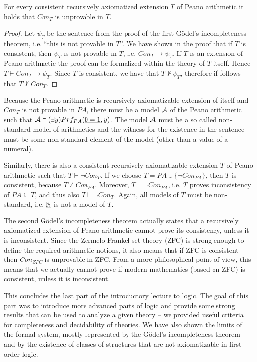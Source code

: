 \begin{theorem}
For every consistent recursively axiomatized extension $T$ of Peano arithmetic it holds that $Con_T$ is unprovable in $T$.
\end{theorem}
\begin{proof}
Let $\psi_T$ be the sentence from the proof of the first Gödel's incompleteness theorem, i.e. ``this is not provable in $T$''. We have shown in the proof that if $T$ is consistent, then $\psi_T$ is not provable in $T$, i.e. $Con_T \to \psi_T$. If $T$ is an extension of Peano arithmetic the proof can be formalized within the theory of $T$ itself. Hence $T\vdash Con_T \to \psi_T$. Since $T$ is consistent, we have that $T\nvdash \psi_T$, therefore if follows that $T \nvdash Con_T$. 
\end{proof}

Because the Peano arithmetic is recursively axiomatizable extension of itself and $Con_T$ is not provable in $PA$, there must be a model $\mathcal{A}$ of the Peano arithmetic such that $\mathcal{A} \vDash (\exists y)Prf_{PA}(\underline{0 = 1}, y)$. The model $\mathcal{A}$ must be a so called non-standard model of arithmetics and the witness for the existence in the sentence must be some non-standard element of the model (other than a value of a numeral).

Similarly, there is also a consistent recursively axiomatizable extension $T$ of Peano arithmetic such that $T \vdash \neg Con_T$. If we choose $T = PA \cup \{\neg Con_{PA}\}$, then $T$ is consistent, because $T \nvdash Con_{PA}$. Moreover, $T \vdash \neg Con_{PA}$, i.e. $T$ proves inconsistency of $PA \subseteq T$, and thus also $T \vdash \neg Con_T$. Again, all models of $T$ must be non-standard, i.e. $\underline{\mathbb{N}}$ is not a model of $T$.

The second Gödel's incompleteness theorem actually states that a recursively axiomatized extension of Peano arithmetic cannot prove its consistency, unless it is inconsistent. Since the Zermelo-Frankel set theory (ZFC) is strong enough to define the required arithmetic notions, it also means that if ZFC is consistent then $Con_{ZFC}$ is unprovable in ZFC. From a more philosophical point of view, this means that we actually cannot prove if modern mathematics (based on ZFC) is consistent, unless it is inconsistent.

\bigskip

This concludes the last part of the introductory lecture to logic. The goal of this part was to introduce more advanced parts of logic and provide some strong results that can be used to analyze a given theory -- we provided useful criteria for completeness and decidability of theories. We have also shown the limits of the formal system, mostly represented by the Gödel's incompleteness theorem and by the existence of classes of structures that are not axiomatizable in first-order logic. 